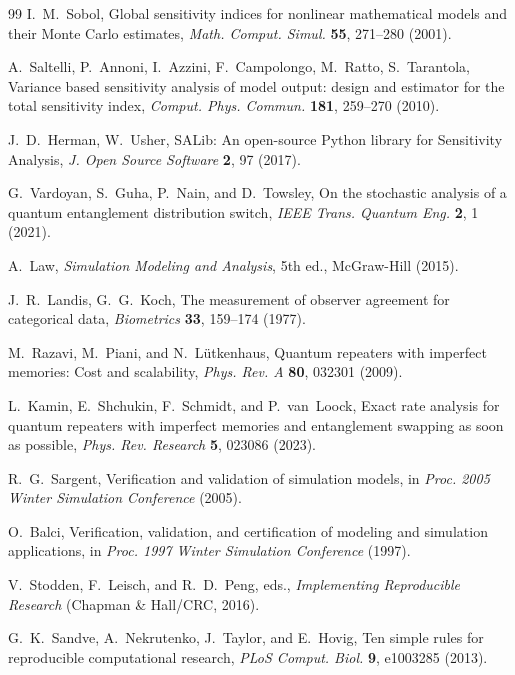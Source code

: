 \documentclass[aps,prapplied,reprint,superscriptaddress]{revtex4-2}
\begin{document}
\begin{thebibliography}{99}
I.~M.~Sobol,
Global sensitivity indices for nonlinear mathematical models and their Monte Carlo estimates,
\emph{Math. Comput. Simul.} \textbf{55}, 271--280 (2001).

A.~Saltelli, P.~Annoni, I.~Azzini, F.~Campolongo, M.~Ratto, S.~Tarantola,
Variance based sensitivity analysis of model output: design and estimator for the total sensitivity index,
\emph{Comput. Phys. Commun.} \textbf{181}, 259--270 (2010).

J.~D.~Herman, W.~Usher,
SALib: An open-source Python library for Sensitivity Analysis,
\emph{J. Open Source Software} \textbf{2}, 97 (2017).

G.~Vardoyan, S.~Guha, P.~Nain, and D.~Towsley,
On the stochastic analysis of a quantum entanglement distribution switch,
\textit{IEEE Trans. Quantum Eng.} \textbf{2}, 1 (2021).

A.~Law, \emph{Simulation Modeling and Analysis}, 5th ed., McGraw-Hill (2015).

J.~R.~Landis, G.~G.~Koch,
The measurement of observer agreement for categorical data,
\emph{Biometrics} \textbf{33}, 159--174 (1977).

M.~Razavi, M.~Piani, and N.~L\"utkenhaus,
Quantum repeaters with imperfect memories: Cost and scalability,
\textit{Phys. Rev. A} \textbf{80}, 032301 (2009).

L.~Kamin, E.~Shchukin, F.~Schmidt, and P.~van~Loock,
Exact rate analysis for quantum repeaters with imperfect memories and entanglement swapping as soon as possible,
\textit{Phys. Rev. Research} \textbf{5}, 023086 (2023).

R.~G.~Sargent,
Verification and validation of simulation models,
in \textit{Proc. 2005 Winter Simulation Conference} (2005).

O.~Balci,
Verification, validation, and certification of modeling and simulation applications,
in \textit{Proc. 1997 Winter Simulation Conference} (1997).

V.~Stodden, F.~Leisch, and R.~D.~Peng, eds.,
\textit{Implementing Reproducible Research} (Chapman \& Hall/CRC, 2016).

G.~K.~Sandve, A.~Nekrutenko, J.~Taylor, and E.~Hovig,
Ten simple rules for reproducible computational research,
\textit{PLoS Comput. Biol.} \textbf{9}, e1003285 (2013).


\end{thebibliography}
\end{document}

